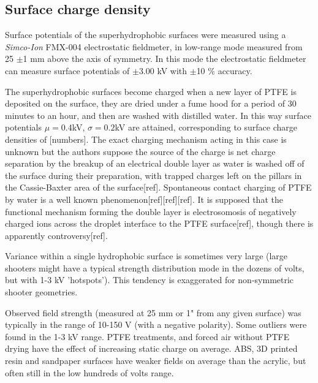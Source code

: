 \documentclass{jfm}
\begin{document}
\subsection{Surface charge density}
Surface potentials of the superhydrophobic surfaces were measured using a \emph{Simco-Ion} FMX-004 electrostatic fieldmeter, in low-range mode measured from 25 $\pm$1 mm above the axis of symmetry. In this mode the electrostatic fieldmeter can measure surface potentials of $\pm$3.00 kV with $\pm$10 $\%$ accuracy.

The superhydrophobic surfaces become charged when a new layer of PTFE is deposited on the surface, they are dried under a fume hood for a period of 30 minutes to an hour, and then are washed with distilled water. In this way surface potentials $\mu = 0.4$kV, $\sigma = 0.2$kV are attained, corresponding to surface charge densities of [numbers]. The exact charging mechanism acting in this case is unknown but the authors suppose the source of the charge is net charge separation by the breakup of an electrical double layer as water is washed off of the surface during their preparation, with trapped charges left on the pillars in the Cassie-Baxter area of the surface[ref]. Spontaneous contact charging of PTFE by water is a well known phenomenon[ref][ref][ref]. It is supposed that the functional mechanism forming the double layer is  electrosomosis of negatively charged ions across the droplet interface to the PTFE surface[ref], though there is apparently controversy[ref].

Variance within a single hydrophobic surface is sometimes very large (large shooters might have a typical strength distribution mode in the dozens of volts, but with 1-3 kV 'hotspots'). This tendency is exaggerated for non-symmetric shooter geometries.
  
Observed field strength (measured at 25 mm or 1" from any given surface)	was typically in the range of 10-150 V (with a negative polarity). Some outliers were found in the 1-3 kV range. PTFE treatments, and forced air without PTFE drying have the effect of increasing static charge on average. ABS, 3D printed resin and sandpaper surfaces have weaker fields on average than the acrylic, but often still in the low hundreds of volts range.
\end{document}
